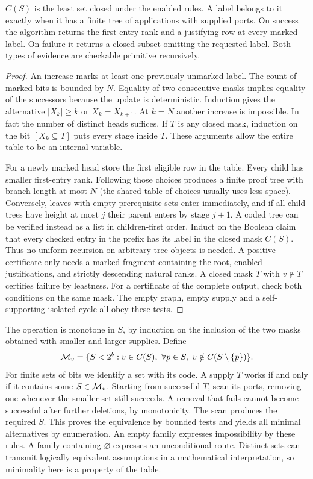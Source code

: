 \begin{thm}\label{th:closure}
$C(S)$ is the least set closed under the enabled rules. A label belongs to it exactly when it has a finite tree of applications with supplied ports. On success the algorithm returns the first-entry rank and a justifying row at every marked label. On failure it returns a closed subset omitting the requested label. Both types of evidence are checkable primitive recursively.
\end{thm}
\begin{proof}
An increase marks at least one previously unmarked label. The count of marked bits is bounded by $N$. Equality of two consecutive masks implies equality of the successors because the update is deterministic. Induction gives the alternative $|X_k|\ge k$ or $X_k=X_{k+1}$. At $k=N$ another increase is impossible. In fact the number of distinct heads suffices. If $T$ is any closed mask, induction on the bit $[X_k\subseteq T]$ puts every stage inside $T$. These arguments allow the entire table to be an internal variable.

For a newly marked head store the first eligible row in the table. Every child has smaller first-entry rank. Following those choices produces a finite proof tree with branch length at most $N$ (the shared table of choices usually uses less space). Conversely, leaves with empty prerequisite sets enter immediately, and if all child trees have height at most $j$ their parent enters by stage $j+1$. A coded tree can be verified instead as a list in children-first order. Induct on the Boolean claim that every checked entry in the prefix has its label in the closed mask $C(S)$. Thus no uniform recursion on arbitrary tree objects is needed. A positive certificate only needs a marked fragment containing the root, enabled justifications, and strictly descending natural ranks. A closed mask $T$ with $v\notin T$ certifies failure by leastness. For a certificate of the complete output, check both conditions on the same mask. The empty graph, empty supply and a self-supporting isolated cycle all obey these tests.
\end{proof}

The operation is monotone in $S$, by induction on the inclusion of the two masks obtained with smaller and larger supplies. Define
\[
 {\cal M}_v=\{S<2^b:v\in C(S),\
       \forall p\in S,\ v\notin C(S\setminus\{p\})\}.
\]
For finite sets of bits we identify a set with its code. A supply $T$ works if and only if it contains some $S\in{\cal M}_v$. Starting from successful $T$, scan its ports, removing one whenever the smaller set still succeeds. A removal that fails cannot become successful after further deletions, by monotonicity. The scan produces the required $S$. This proves the equivalence by bounded tests and yields all minimal alternatives by enumeration. An empty family expresses impossibility by these rules. A family containing $\varnothing$ expresses an unconditional route. Distinct sets can transmit logically equivalent assumptions in a mathematical interpretation, so minimality here is a property of the table.

